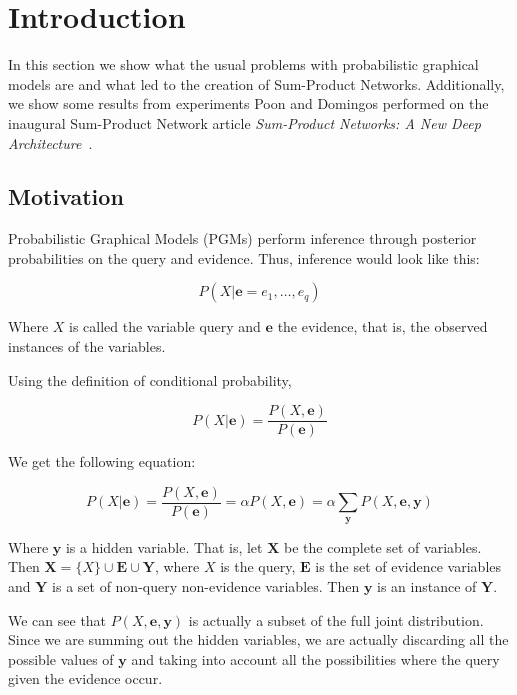 \documentclass[a4paper,10pt]{article}
\theoremstyle{plain}
\begin{document}
\section{Introduction}

In this section we show what the usual problems with probabilistic graphical models are and what
led to the creation of Sum-Product Networks. Additionally, we show some results from experiments
Poon and Domingos performed on the inaugural Sum-Product Network article \textit{Sum-Product
Networks: A New Deep Architecture}~\cite{poon-domingos}.

\subsection{Motivation}

Probabilistic Graphical Models (PGMs) perform inference through posterior probabilities on the
query and evidence. Thus, inference would look like this:

\begin{equation*}
  P(X | \mathbf{e}=e_1,\ldots,e_q)
\end{equation*}

Where $X$ is called the variable query and $\mathbf{e}$ the evidence, that is, the observed
instances of the variables.

Using the definition of conditional probability,

\begin{equation*}
  P(X|\mathbf{e})=\frac{P(X,\mathbf{e})}{P(\mathbf{e})}
\end{equation*}

We get the following equation:

\begin{equation}
  P(X|\mathbf{e})=\frac{P(X,\mathbf{e})}{P(\mathbf{e})}=\alpha P(X,\mathbf{e})=\alpha
  \sum_{\mathbf{y}} P(X,\mathbf{e},\mathbf{y})
\end{equation}

Where $\mathbf{y}$ is a hidden variable. That is, let $\mathbf{X}$ be the complete set of
variables. Then $\mathbf{X}=\{X\} \cup \mathbf{E} \cup \mathbf{Y}$, where $X$ is the query,
$\mathbf{E}$ is the set of evidence variables and $\mathbf{Y}$ is a set of non-query non-evidence
variables. Then $\mathbf{y}$ is an instance of $\mathbf{Y}$.

We can see that $P(X,\mathbf{e},\mathbf{y})$ is actually a subset of the full joint distribution.
Since we are summing out the hidden variables, we are actually discarding all the possible values
of $\mathbf{y}$ and taking into account all the possibilities where the query given the evidence
occur.
\end{document}
